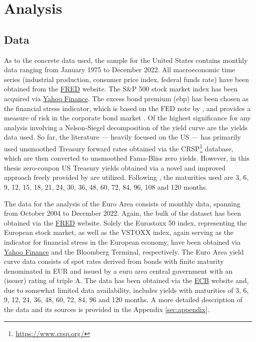 \section{Analysis}
\label{sec:analysis}

\subsection{Data}
\label{sec:data}

As to the concrete data used, the sample for the United States contains monthly data ranging from January 1975 to December 2022. 
All macroeconomic time series (industrial production, consumer price index, federal funds rate) have been obtained from the \href{https://fred.stlouisfed.org/}{FRED} website. 
The S\&P 500 stock market index has been acquired via \href{https://finance.yahoo.com/}{Yahoo Finance}. 
The excess bond premium (ebp) has been chosen as the financial stress indicator, which is based on the FED note by \citet{favara2016updating}, and provides a measure of risk in the corporate bond market \citep{gilchrist_2012}. 
Of the highest significance for any analysis involving a Nelson-Siegel decomposition of the yield curve are the yields data used. So far, the literature --- heavily focused on the US --- has primarily used unsmoothed \citet{fama1987information} Treasury forward rates obtained via the CRSP\footnote{\url{https://www.crsp.org/}} database, which are then converted to unsmoothed Fama-Bliss zero yields. However, in this thesis zero-coupon US Treasury yields obtained via a novel and improved approach freely provided by \citet{liu2021reconstructing} are utilized. Following \citet{diebold2006macroeconomy}, the maturities used are 3, 6, 9, 12, 15, 18, 21, 24, 30, 36, 48, 60, 72, 84, 96, 108 and 120 months. 


The data for the analysis of the Euro Area consists of monthly data, spanning from October 2004 to December 2022. Again, the bulk of the dataset has been obtained via the \href{https://fred.stlouisfed.org/}{FRED} website. Solely the Eurostoxx 50 index, representing the European stock market, as well as the VSTOXX index, again serving as the indicator for financial stress in the European economy, have been obtained via \href{https://finance.yahoo.com/}{Yahoo Finance} and the Bloomberg Terminal, respectively. The Euro Area yield curve data consists of spot rates derived from bonds with finite maturity denominated in EUR and issued by a euro area central government with an (issuer) rating of triple A. The data has been obtained via the \href{https://www.ecb.europa.eu/stats/financial_markets_and_interest_rates/euro_area_yield_curves/html/index.en.html}{ECB} website and, due to somewhat limited data availability, includes yields with maturities of 3, 6, 9, 12, 24, 36, 48, 60, 72, 84, 96 and 120 months.
A more detailed description of the data and its sources is provided in the Appendix \ref{sec:appendix}. 

